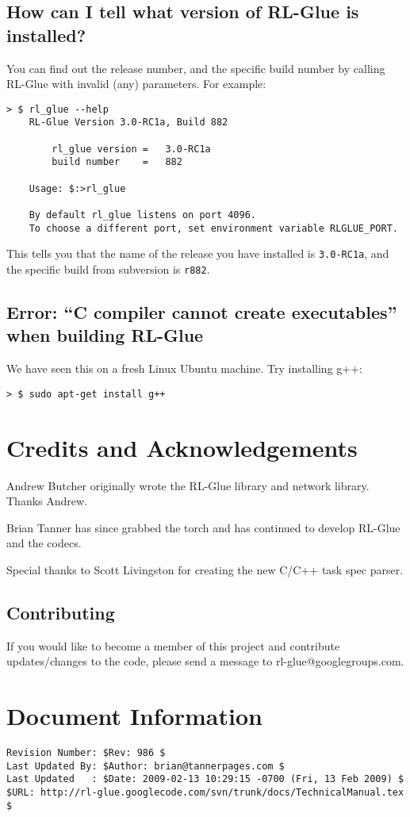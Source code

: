 \documentclass[11pt]{article}
\begin{document}
\subsection{How can I tell what version of RL-Glue is installed?}
You can find out the release number, and the specific build number by 
calling RL-Glue with invalid (any) parameters.  For example:
\begin{verbatim}
> $ rl_glue --help
    RL-Glue Version 3.0-RC1a, Build 882

        rl_glue version	=	3.0-RC1a
        build number	=	882

    Usage: $:>rl_glue

    By default rl_glue listens on port 4096.
    To choose a different port, set environment variable RLGLUE_PORT.
\end{verbatim}

This tells you that the name of the release you have installed is \texttt{3.0-RC1a}, and the 
specific build from subversion is \texttt{r882}.


\subsection{Error: ``C compiler cannot create executables'' when building RL-Glue}

We have seen this on a fresh Linux Ubuntu machine.  Try installing g++:
\begin{verbatim}
> $ sudo apt-get install g++
\end{verbatim}


\section{Credits and Acknowledgements}
Andrew Butcher originally wrote the RL-Glue library and network library.  Thanks Andrew.

Brian Tanner has since grabbed the torch and has continued to develop RL-Glue and the codecs.

Special thanks to Scott Livingston for creating the new C/C++ task spec parser.

\subsection{Contributing}
If you would like to become a member of this project and contribute updates/changes to the code, please send a message to rl-glue@googlegroups.com.


\section*{Document Information}
\begin{verbatim}
Revision Number: $Rev: 986 $
Last Updated By: $Author: brian@tannerpages.com $
Last Updated   : $Date: 2009-02-13 10:29:15 -0700 (Fri, 13 Feb 2009) $
$URL: http://rl-glue.googlecode.com/svn/trunk/docs/TechnicalManual.tex $
\end{verbatim}
\end{document}
